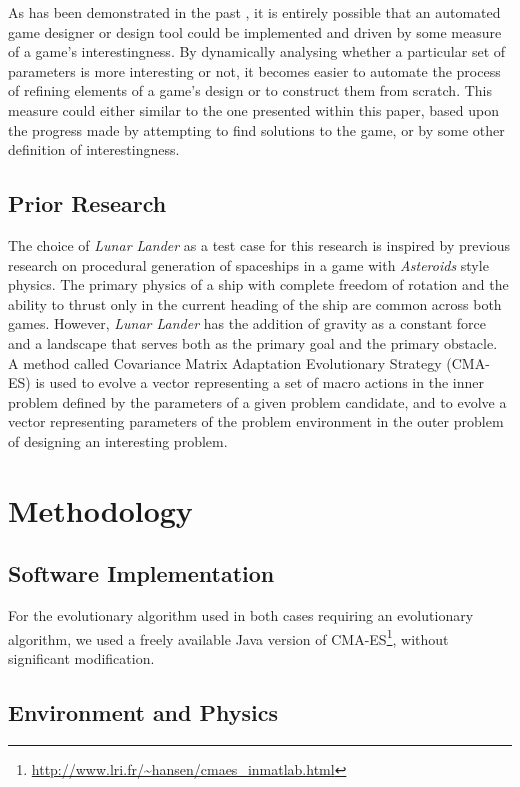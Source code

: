\documentclass[conference]{IEEEtran}
\begin{document}
As has been demonstrated in the past \cite{brown10}, it is entirely possible that an automated game designer or design tool could be implemented and driven by some measure of a game's interestingness. By dynamically analysing whether a particular set of parameters is more interesting or not, it becomes easier to automate the process of refining elements of a game's design or to construct them from scratch. This measure could either similar to the one presented within this paper, based upon the progress made by attempting to find solutions to the game, or by some other definition of interestingness. 

\subsection{Prior Research}

The choice of {\itshape Lunar Lander} as a test case for this research is inspired by previous research \cite{roberts12} on procedural generation of spaceships in a game with {\itshape Asteroids} style physics. The primary physics of a ship with complete freedom of rotation and the ability to thrust only in the current heading of the ship are common across both games. However, {\itshape Lunar Lander} has the addition of gravity as a constant force and a landscape that serves both as the primary goal and the primary obstacle.
A method called Covariance Matrix Adaptation Evolutionary Strategy (CMA-ES) \cite{hansen06} is used to evolve a vector representing a set of macro actions in the inner problem defined by the parameters of a given problem candidate, and to evolve a vector representing parameters of the problem environment in the outer problem of designing an interesting problem.

\section{Methodology}

\subsection{Software Implementation}

For the evolutionary algorithm used in both cases requiring an evolutionary algorithm, we used a freely available Java version of
CMA-ES\footnote{\url{http://www.lri.fr/~hansen/cmaes_inmatlab.html}}, without significant modification. 

\subsection{Environment and Physics}
\end{document}
